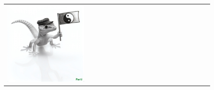 \begin{figure}[ht!]
\begin{adjustwidth}{-0.8in}{-0.5in}
\begin{tabular}{cccccccccccccccccccc}
\multicolumn{2}{c}{\includegraphics[width=\threebythreecolwidth\textwidth]{figures/cherries/charcoal.jpg}} \\


\end{tabular}
\end{adjustwidth}
\end{figure}
